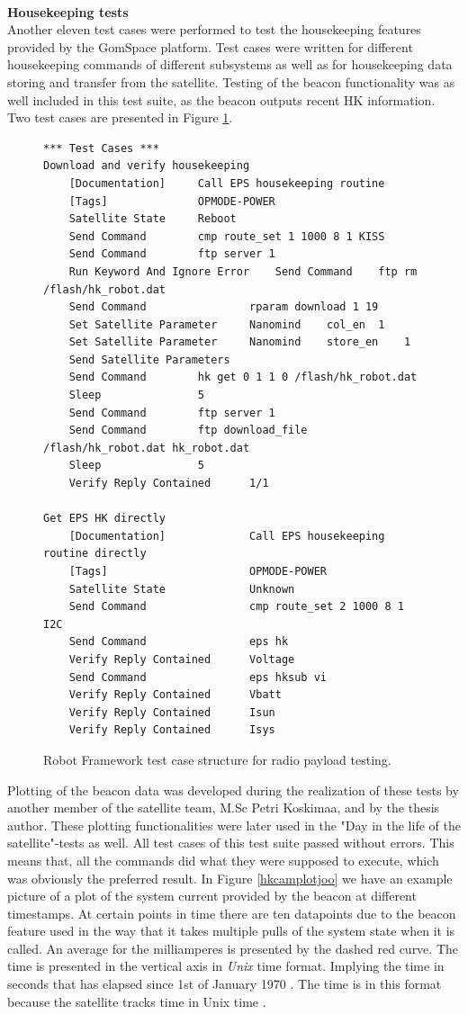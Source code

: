\documentclass[english,12pt,a4paper,pdftex,elec,utf8]{aaltothesis}
\begin{document}
\\
\textbf{Housekeeping tests}
\\ 
Another eleven test cases were performed to test the housekeeping features provided by the GomSpace platform. Test cases were written for different housekeeping commands of different subsystems as well as for housekeeping data storing and transfer from the satellite. Testing of the beacon functionality was as well included in this test suite, as the beacon outputs recent HK information. Two test cases are presented in Figure \ref{robothk}. \par
\begin{figure}[h!]
\centering
\begin{verbatim}
*** Test Cases ***
Download and verify housekeeping
	[Documentation]		Call EPS housekeeping routine
	[Tags]				OPMODE-POWER
	Satellite State 	Reboot
	Send Command 		cmp route_set 1 1000 8 1 KISS
	Send Command 		ftp server 1
	Run Keyword And Ignore Error 	Send Command 	ftp rm /flash/hk_robot.dat
	Send Command 				rparam download 1 19
	Set Satellite Parameter		Nanomind	col_en 	1
	Set Satellite Parameter		Nanomind	store_en 	1
	Send Satellite Parameters
	Send Command 		hk get 0 1 1 0 /flash/hk_robot.dat
	Sleep 				5
	Send Command 		ftp server 1
	Send Command 		ftp download_file /flash/hk_robot.dat hk_robot.dat
	Sleep 				5
	Verify Reply Contained	  	1/1

Get EPS HK directly
	[Documentation]				Call EPS housekeeping routine directly
	[Tags]						OPMODE-POWER
	Satellite State 			Unknown
	Send Command 				cmp route_set 2 1000 8 1 I2C
	Send Command 				eps hk
	Verify Reply Contained 		Voltage
	Send Command 				eps hksub vi
	Verify Reply Contained 		Vbatt
	Verify Reply Contained 		Isun
	Verify Reply Contained 		Isys
\end{verbatim}
\caption{Robot Framework test case structure for radio payload testing.}
\label{robothk}
\end{figure}  
Plotting of the beacon data was developed during the realization of these tests by another member of the satellite team, M.Sc Petri Koskimaa, and by the thesis author. These plotting functionalities were later used in the "Day in the life of the satellite"-tests as well. All test cases of this test suite passed without errors. This means that, all the commands did what they were supposed to execute, which was obviously the preferred result. In Figure \ref{hkcamplotjoo} we have an example picture of a plot of the system current provided by the beacon at different timestamps. At certain points in time there are ten datapoints due to the beacon feature used in the way that it takes multiple pulls of the system state when it is called. An average for the milliamperes is presented by the dashed red curve. The time is presented in the vertical axis in \textit{Unix} time format. Implying the time in seconds that has elapsed since 1st of January 1970 \cite{linuxproginterface}. The time is in this format because the satellite tracks time in Unix time \cite{nanomindds}.\par 
\end{document}
